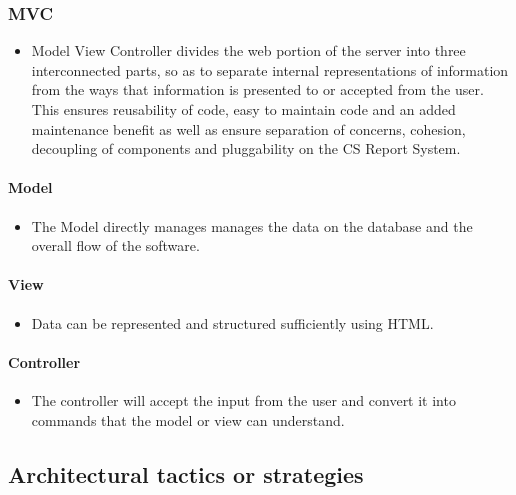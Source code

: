 \documentclass{article}
\begin{document}
           \subsubsection{MVC} %
            \begin{itemize}
          \item  Model View Controller divides the web portion of the server into three interconnected parts, so as 					to 	separate internal representations of information from the ways that information is presented to or 					accepted from the user. This ensures reusability  of code, easy to maintain code and an added maintenance 			beneﬁt as well as ensure separation of concerns, cohesion, decoupling of components and pluggability on 					the CS 	Report System.
			\end{itemize}         	
        	
         
            \paragraph{Model} %
            \begin{itemize}
            \item The Model directly manages manages the data on the database and the overall flow of the software.
            \end{itemize} 
            \paragraph{View} %
              \begin{itemize}
            \item Data can be represented and structured sufficiently using HTML.
            \end{itemize} 
            \paragraph{Controller} %
              \begin{itemize}
            \item The controller will accept the input from the user and convert it into commands that 		the 					model or view can understand.
            
              \end{itemize} 
         
         
         
       \subsection{Architectural tactics or strategies}
\end{document}
